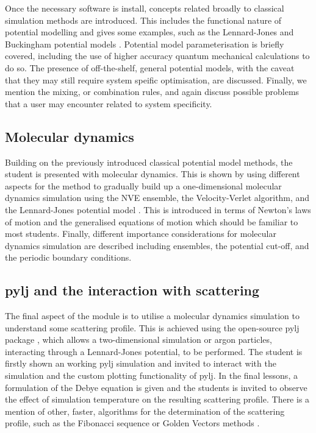 \documentclass[amsmath,amssymb,twocolumn,superscriptaddress,aps,prl]{revtex4-1}
\begin{document}
Once the necessary software is install, concepts related broadly to classical simulation methods are introduced. 
This includes the functional nature of potential modelling and gives some examples, such as the Lennard-Jones and Buckingham potential models \cite{LennardJones1924,Buckingham1938}.
Potential model parameterisation is briefly covered, including the use of higher accuracy quantum mechanical calculations to do so. 
The presence of off-the-shelf, general potential models, with the caveat that they may still require system speific optimisation, are discussed. 
Finally, we mention the mixing, or combination rules, and again discuss possible problems that a user may encounter related to system specificity. 

\subsection{Molecular dynamics}

Building on the previously introduced classical potential model methods, the student is presented with molecular dynamics. 
This is shown by using different aspects for the method to gradually build up a one-dimensional molecular dynamics simulation using the NVE ensemble, the Velocity-Verlet algorithm, and the Lennard-Jones potential model \cite{Swope1982,LennardJones1924}.
This is introduced in terms of Newton's laws of motion and the generalised equations of motion which should be familiar to most students. 
Finally, different importance considerations for molecular dynamics simulation are described including ensembles, the potential cut-off, and the periodic boundary conditions. 

\subsection{pylj and the interaction with scattering}

The final aspect of the module is to utilise a molecular dynamics simulation to understand some scattering profile. 
This is achieved using the open-source pylj package \cite{McCluskey2018}, which allows a two-dimensional simulation or argon particles, interacting through a Lennard-Jones potential, to be performed.
The student is firstly shown an working pylj simulation and invited to interact with the simulation and the custom plotting functionality of pylj. 
In the final lessons, a formulation of the Debye equation \cite{Debye1915} is given and the students is invited to observe the effect of simulation temperature on the resulting scattering profile. 
There is a mention of other, faster, algorithms for the determination of the scattering profile, such as the Fibonacci sequence or Golden Vectors methods \cite{Svergun1994,Watson2013}. 
\end{document}
